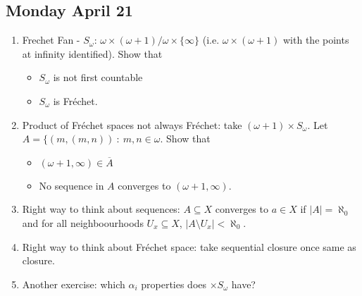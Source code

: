 \documentclass{article}
\begin{document}
\subsection*{Monday April 21} 
\begin{enumerate}
    \item Frechet Fan - \(S_{\omega}\): \(\omega \times (\omega + 1) / \omega \times \{\infty\}\) (i.e. \(\omega \times ( \omega + 1)\) with the points at infinity identified). Show that 
    \begin{itemize}
        \item \(S_{\omega}\) is not first countable \checkmark
        \item \(S_{\omega}\) is Fréchet. \checkmark
    \end{itemize}

    \item Product of Fréchet spaces not always Fréchet: take \((\omega + 1) \times S_{\omega}\). Let \(A = \{(m, (m, n)) \: : \: m,n \in \omega\). Show that 
    \begin{itemize}
        \item \((\omega + 1, \infty) \in \overline{A}\) \checkmark
        \item No sequence in \(A\) converges to \((\omega + 1, \infty)\). \checkmark
    \end{itemize}

    \item Right way to think about sequences: \(A \subseteq X\) converges to \(a \in X\) if \(|A| = \aleph_0\) and for all neighboourhoods \(U_x \subseteq X\), \(|A \setminus U_x| < \aleph_0\).
    
    \item Right way to think about Fréchet space: take sequential closure once same as closure.
    \item Another exercise: which \(\alpha_i\) properties does \(\times S_{\omega}\) have? \checkmark
\end{enumerate}
\end{document}
